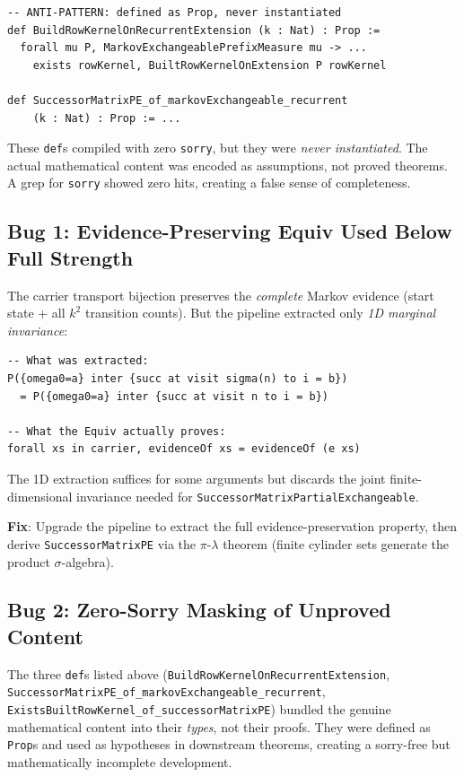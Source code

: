 \documentclass[11pt,a4paper]{article}
\theoremstyle{definition}
\begin{document}
\begin{lstlisting}
-- ANTI-PATTERN: defined as Prop, never instantiated
def BuildRowKernelOnRecurrentExtension (k : Nat) : Prop :=
  forall mu P, MarkovExchangeablePrefixMeasure mu -> ...
    exists rowKernel, BuiltRowKernelOnExtension P rowKernel

def SuccessorMatrixPE_of_markovExchangeable_recurrent
    (k : Nat) : Prop := ...
\end{lstlisting}

These \texttt{def}s compiled with zero \texttt{sorry}, but they were
\emph{never instantiated}. The actual mathematical content was encoded
as assumptions, not proved theorems. A grep for \texttt{sorry} showed
zero hits, creating a false sense of completeness.

\subsection{Bug 1: Evidence-Preserving Equiv Used Below Full Strength}

The carrier transport bijection preserves the \emph{complete} Markov
evidence (start state + all $k^2$ transition counts). But the pipeline
extracted only \emph{1D marginal invariance}:

\begin{lstlisting}
-- What was extracted:
P({omega0=a} inter {succ at visit sigma(n) to i = b})
  = P({omega0=a} inter {succ at visit n to i = b})

-- What the Equiv actually proves:
forall xs in carrier, evidenceOf xs = evidenceOf (e xs)
\end{lstlisting}

The 1D extraction suffices for some arguments but discards the joint
finite-dimensional invariance needed for \texttt{SuccessorMatrixPartialExchangeable}.

\textbf{Fix}: Upgrade the pipeline to extract the full evidence-preservation
property, then derive \texttt{SuccessorMatrixPE} via the $\pi$-$\lambda$
theorem (finite cylinder sets generate the product $\sigma$-algebra).

\subsection{Bug 2: Zero-Sorry Masking of Unproved Content}

The three \texttt{def}s listed above (\texttt{BuildRowKernelOnRecurrentExtension},
\texttt{SuccessorMatrixPE\_of\_markovExchangeable\_recurrent},
\texttt{ExistsBuiltRowKernel\_of\_successorMatrixPE}) bundled the genuine
mathematical content into their \emph{types}, not their proofs.
They were defined as \texttt{Prop}s and used as hypotheses in downstream
theorems, creating a sorry-free but mathematically incomplete development.
\end{document}
